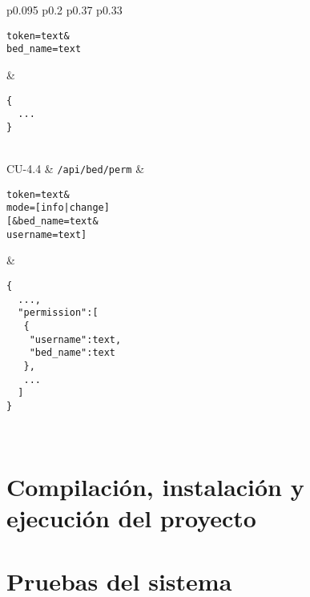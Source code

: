 \begin{center}
\begin{xtabular}{p{0.095\textwidth} p{0.2\textwidth} p{0.37\textwidth} p{0.33\textwidth}}
\begin{lstlisting}[language=JSONT]
token=text&
bed_name=text
\end{lstlisting}
&
\begin{lstlisting}[language=JSONT]
{
  ...
}\end{lstlisting}
\\\hubu
CU-4.4		&	\texttt{/api/bed/perm}	& 
\begin{lstlisting}[language=JSONT]
token=text&
mode=[info|change]
[&bed_name=text&
username=text]
\end{lstlisting}
&
\begin{lstlisting}[language=JSONT]
{
  ...,
  "permission":[
   {
    "username":text,
    "bed_name":text
   },
   ...
  ]
}\end{lstlisting}
\\\bottomrule
	\end{xtabular}
	\label{tabla:api-specs2}
\end{center}

\section{Compilación, instalación y ejecución del proyecto}

\section{Pruebas del sistema}
